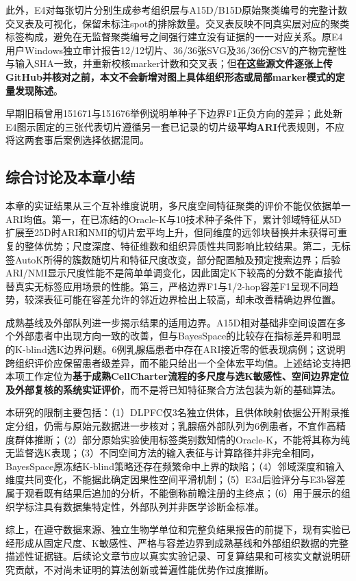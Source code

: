 此外，E4对每张切片分别生成参考组织层与A15D/B15D原始聚类编号的完整计数交叉表及可视化，保留未标注spot的排除数量。交叉表反映不同真实层对应的聚类标签构成，避免在无监督聚类编号之间强行建立没有证据的一一对应关系。原E4用户Windows独立审计报告12/12切片、36/36张SVG及36/36份CSV的产物完整性与输入SHA一致，并重新校核marker计数和交叉表；但\textbf{在这些源文件逐张上传GitHub并核对之前，本文不会新增对图上具体组织形态或局部marker模式的定量发现陈述}。

早期旧稿曾用151671与151676举例说明单种子下边界F1正负方向的差异；此处新E4图示固定的三张代表切片遵循另一套已记录的切片级\textbf{平均ARI}代表规则，不应将这两套事后案例选择依据混同。
 

\subsection{综合讨论及本章小结}
\label{subsec:cellcharter-discussion-v1}

本章的实证结果从三个互补维度说明，多尺度空间特征聚类的评价不能仅依据单一ARI均值。第一，在已冻结的Oracle-K与10技术种子条件下，累计邻域特征从5D扩展至25D时ARI和NMI的切片宏平均上升，但同维度的远邻块替换并未获得可重复的整体优势；尺度深度、特征维数和组织异质性共同影响比较结果。第二，无标签AutoK所得的簇数随切片和特征尺度改变，部分配置触及预定搜索边界；后验ARI/NMI显示尺度性能不是简单单调变化，因此固定K下较高的分数不能直接代替真实无标签应用场景的性能。第三，严格边界F1与1/2-hop容差F1呈现不同趋势，较深表征可能在容差允许的邻近边界检出上较高，却未改善精确边界位置。

成熟基线及外部队列进一步揭示结果的适用边界。A15D相对基础非空间设置在多个外部患者中出现方向一致的改善，但与BayesSpace的比较存在指标差异和明显的K-blind选K边界问题。6例乳腺癌患者中存在ARI接近零的低表现病例；这说明跨组织评价应保留患者级差异，而不能只给出一个全体宏平均值。上述结论支持把本项工作定位为\textbf{基于成熟CellCharter流程的多尺度与选K敏感性、空间边界定位及外部复核的系统实证评价}，而不是将已知特征聚合方法包装为新的基础算法。

本研究的限制主要包括：（1）DLPFC仅3名独立供体，且供体映射依据公开附录推定分组，仍需与原始元数据进一步核对；乳腺癌外部队列为6例患者，不宜作高精度群体推断；（2）部分原始实验使用标签类别数知情的Oracle-K，不能将其称为纯无监督选K表现；（3）不同空间方法的输入表征与计算路径并非完全相同，BayesSpace原冻结K-blind策略还存在频繁命中上界的缺陷；（4）邻域深度和输入维度共同变化，不能据此确定因果性空间平滑机制；（5）E3d后验评分与E3b容差属于观看既有结果后追加的分析，不能倒称前瞻注册的主终点；（6）用于展示的组织学标注具有数据集特定性，外部队列并非医学诊断金标准。

综上，在遵守数据来源、独立生物学单位和完整负结果报告的前提下，现有实验已经形成从固定尺度、K敏感性、严格与容差边界到成熟基线和外部组织数据的完整描述性证据链。后续论文章节应以真实实验记录、可复算结果和可核实文献说明研究贡献，不对尚未证明的算法创新或普遍性能优势作过度推断。
